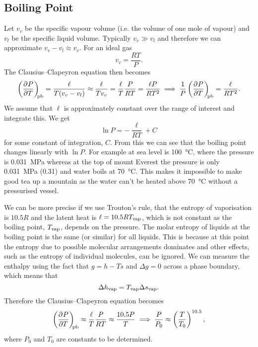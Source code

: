     \subsection{Boiling Point}
    Let \(v_v\) be the specific vapour volume (i.e. the volume of one mole of vapour) and \(v_l\) be the specific liquid volume.
    Typically \(v_v \gg v_l\) and therefore we can approximate \(v_v - v_l \approx v_v\).
    For an ideal gas
    \[v_v = \frac{RT}{P}.\]
    The Clausius--Clapeyron equation then becomes
    \[\left(\pdv[]{P}{T}\right)_{\!\!{\mathrm{pb}}} = \frac{\ell}{T(v_v - v_l)} \approx \frac{\ell}{Tv_v} = \frac{\ell}{T}\frac{P}{RT} = \frac{\ell P}{RT^2} \implies \frac{1}{P}\left(\pdv[]{P}{T}\right)_{\!\!{\mathrm{pb}}} = \frac{\ell}{RT^2}.\]
    We assume that \(\ell\) is approximately constant over the range of interest and integrate this.
    We get
    \[\ln P = -\frac{\ell}{RT} + C\]
    for some constant of integration, \(C\).
    From this we can see that the boiling point changes linearly with \(\ln P\).
    For example at sea level is \SI{100}{\degreeCelsius}, where the pressure is \SI{0.031}{\mega\pascal} whereas at the top of mount Everest the pressure is only \SI{0.031}{\mega\pascal} (\SI{0.31}{\atm}) and water boils at \SI{70}{\degreeCelsius}.
    This makes it impossible to make good tea up a mountain as the water can't be heated above \SI{70}{\degreeCelsius} without a pressurised vessel.
    
    We can be more precise if we use Trouton's rule, that the entropy of vaporisation is \(10.5R\) and the latent heat is \(\ell = 10.5RT_{{\mathrm{vap}}}\), which is not constant as the boiling point, \(T_{{\mathrm{vap}}}\), depends on the pressure.
    The molar entropy of liquids at the boiling point is the same (or similar) for all liquids.
    This is because at this point the entropy due to possible molecular arrangements dominates and other effects, such as the entropy of individual molecules, can be ignored.
    We can measure the enthalpy using the fact that \(g = h - Ts\) and \(\Delta g = 0\) across a phase boundary, which means that
    \[\Delta h_{{\mathrm{vap}}} = T_{{\mathrm{vap}}}\Delta s_{{\mathrm{vap}}}.\]
    Therefore the Clausius--Clapeyron equation becomes
    \[\left(\pdv[]{P}{T}\right)_{\!\!{\mathrm{pb}}} \approx \frac{\ell}{T}\frac{P}{RT} \approx \frac{10.5P}{T} \implies \frac{P}{P_0} \approx \left(\frac{T}{T_0}\right)^{10.5},\]
    where \(P_0\) and \(T_0\) are constants to be determined.
    
